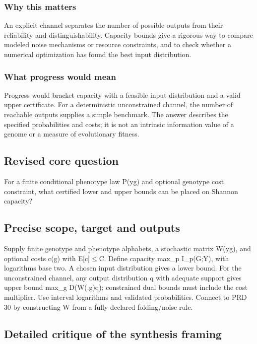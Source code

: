 \documentclass[
  11pt,
]{article}
\begin{document}
\subsubsection{Why this matters}

An explicit channel separates the number of possible outputs from their
reliability and distinguishability. Capacity bounds give a rigorous way
to compare modeled noise mechanisms or resource constraints, and to
check whether a numerical optimization has found the best input
distribution.

\subsubsection{What progress would mean}

Progress would bracket capacity with a feasible input distribution and a
valid upper certificate. For a deterministic unconstrained channel, the
number of reachable outputs supplies a simple benchmark. The answer
describes the specified probabilities and costs; it is not an intrinsic
information value of a genome or a measure of evolutionary fitness.

\subsection{Revised core question}

For a finite conditional phenotype law P(y\textbar g) and optional
genotype cost constraint, what certified lower and upper bounds can be
placed on Shannon capacity?

\subsection{Precise scope, target and outputs}

Supply finite genotype and phenotype alphabets, a stochastic matrix
W(y\textbar g), and optional costs c(g) with E[c]\ensuremath{\le}C.
Define capacity max\_p I\_p(G;Y), with logarithms base two. A chosen
input distribution gives a lower bound. For the unconstrained channel,
any output distribution q with adequate support gives upper bound max\_g
D(W(.\textbar g)\textbar\textbar q); constrained dual bounds must
include the cost multiplier. Use interval logarithms and validated
probabilities. Connect to PRD 30 by constructing W from a fully declared
folding/noise rule.

\subsection{Detailed critique of the synthesis framing}
\end{document}
